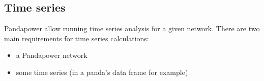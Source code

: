 




\subsection{Time series}
Pandapower allow running time series analysis for a given network. There are two main requirements for time series calculations:
\begin{itemize}
    \item a Pandapower network
    \item some time series (in a panda's data frame for example)
\end{itemize}


